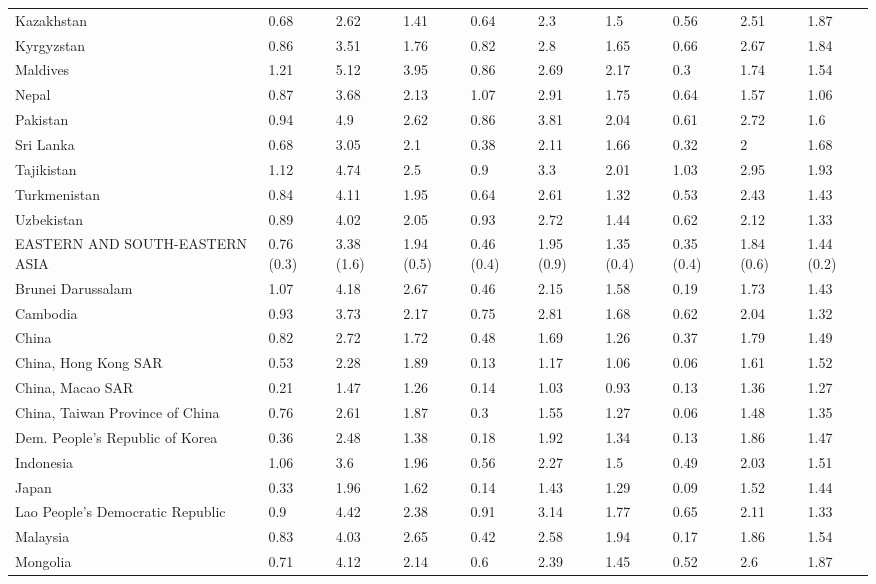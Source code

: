 \begin{longtable}[t]{llllllllll}
Kazakhstan & 0.68 & 2.62 & 1.41 & 0.64 & 2.3 & 1.5 & 0.56 & 2.51 & 1.87\\
Kyrgyzstan & 0.86 & 3.51 & 1.76 & 0.82 & 2.8 & 1.65 & 0.66 & 2.67 & 1.84\\
Maldives & 1.21 & 5.12 & 3.95 & 0.86 & 2.69 & 2.17 & 0.3 & 1.74 & 1.54\\
Nepal & 0.87 & 3.68 & 2.13 & 1.07 & 2.91 & 1.75 & 0.64 & 1.57 & 1.06\\
Pakistan & 0.94 & 4.9 & 2.62 & 0.86 & 3.81 & 2.04 & 0.61 & 2.72 & 1.6\\
Sri Lanka & 0.68 & 3.05 & 2.1 & 0.38 & 2.11 & 1.66 & 0.32 & 2 & 1.68\\
Tajikistan & 1.12 & 4.74 & 2.5 & 0.9 & 3.3 & 2.01 & 1.03 & 2.95 & 1.93\\
Turkmenistan & 0.84 & 4.11 & 1.95 & 0.64 & 2.61 & 1.32 & 0.53 & 2.43 & 1.43\\
Uzbekistan & 0.89 & 4.02 & 2.05 & 0.93 & 2.72 & 1.44 & 0.62 & 2.12 & 1.33\\
EASTERN AND SOUTH-EASTERN ASIA & 0.76 (0.3) & 3.38 (1.6) & 1.94 (0.5) & 0.46 (0.4) & 1.95 (0.9) & 1.35 (0.4) & 0.35 (0.4) & 1.84 (0.6) & 1.44 (0.2)\\
Brunei Darussalam & 1.07 & 4.18 & 2.67 & 0.46 & 2.15 & 1.58 & 0.19 & 1.73 & 1.43\\
Cambodia & 0.93 & 3.73 & 2.17 & 0.75 & 2.81 & 1.68 & 0.62 & 2.04 & 1.32\\
China & 0.82 & 2.72 & 1.72 & 0.48 & 1.69 & 1.26 & 0.37 & 1.79 & 1.49\\
China, Hong Kong SAR & 0.53 & 2.28 & 1.89 & 0.13 & 1.17 & 1.06 & 0.06 & 1.61 & 1.52\\
China, Macao SAR & 0.21 & 1.47 & 1.26 & 0.14 & 1.03 & 0.93 & 0.13 & 1.36 & 1.27\\
China, Taiwan Province of China & 0.76 & 2.61 & 1.87 & 0.3 & 1.55 & 1.27 & 0.06 & 1.48 & 1.35\\
Dem. People's Republic of Korea & 0.36 & 2.48 & 1.38 & 0.18 & 1.92 & 1.34 & 0.13 & 1.86 & 1.47\\
Indonesia & 1.06 & 3.6 & 1.96 & 0.56 & 2.27 & 1.5 & 0.49 & 2.03 & 1.51\\
Japan & 0.33 & 1.96 & 1.62 & 0.14 & 1.43 & 1.29 & 0.09 & 1.52 & 1.44\\
Lao People's Democratic Republic & 0.9 & 4.42 & 2.38 & 0.91 & 3.14 & 1.77 & 0.65 & 2.11 & 1.33\\
Malaysia & 0.83 & 4.03 & 2.65 & 0.42 & 2.58 & 1.94 & 0.17 & 1.86 & 1.54\\
Mongolia & 0.71 & 4.12 & 2.14 & 0.6 & 2.39 & 1.45 & 0.52 & 2.6 & 1.87\\

\end{longtable}

